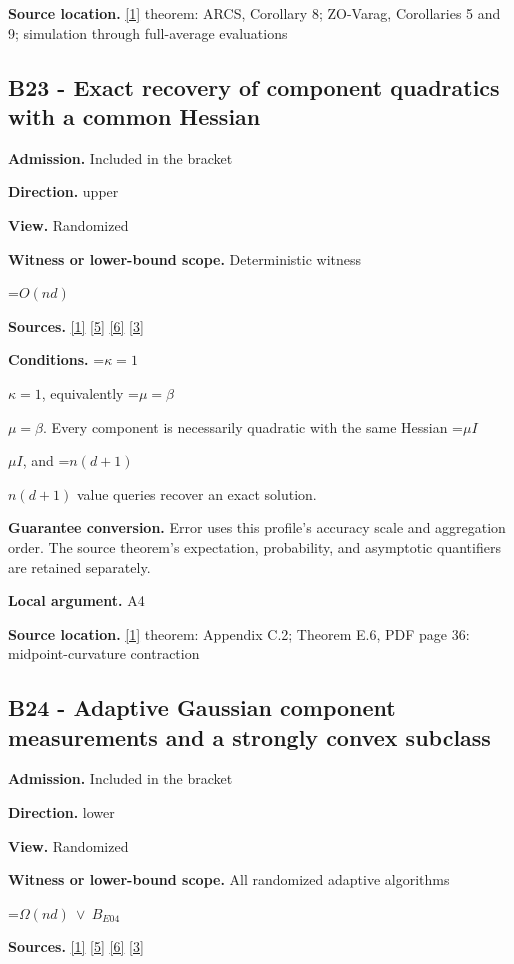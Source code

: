 \documentclass[10pt,a4paper]{article}
\newcommand{\AtlasMath}[1]{\par\begingroup\centering\setbox0=\hbox{$\displaystyle #1$}\ifdim\wd0>1.4\linewidth\typeout{ATLAS WIDE FORMULA: \the\wd0}\fi\ifdim\wd0>\linewidth\resizebox{\linewidth}{!}{\box0}\else\box0\fi\par\endgroup}
\newcommand{\AtlasInlineMath}[1]{\begingroup\setbox0=\hbox{$#1$}\ifdim\wd0>.4\linewidth\endgroup\AtlasMath{#1}\else\endgroup$#1$\fi}
\begin{document}
\textbf{Source location.} \href{https://arxiv.org/html/2610.00345v1}{[1]} theorem: ARCS, Corollary 8; ZO-Varag, Corollaries 5 and 9; simulation through full-average evaluations

\subsection{B23 - Exact recovery of component quadratics with a common Hessian}
\textbf{Admission.} Included in the bracket

\textbf{Direction.} upper

\textbf{View.} Randomized

\textbf{Witness or lower-bound scope.} Deterministic witness

\AtlasMath{O(nd)}
\textbf{Sources.} \href{https://arxiv.org/html/2610.00345v1}{[1]} \href{https://arxiv.org/html/2607.16558v2}{[5]} \href{https://www.mathnet.ru/php/archive.phtml?jrnid=mzm&option_lang=eng&paperid=1697&wshow=paper}{[6]} \href{https://arxiv.org/abs/2109.08858}{[3]}

\textbf{Conditions.} \AtlasInlineMath{\kappa=1}, equivalently \AtlasInlineMath{\mu=\beta}. Every component is necessarily quadratic with the same Hessian \AtlasInlineMath{\mu I}, and \AtlasInlineMath{n(d+1)} value queries recover an exact solution.

\textbf{Guarantee conversion.} Error uses this profile's accuracy scale and aggregation order. The source theorem's expectation, probability, and asymptotic quantifiers are retained separately.

\textbf{Local argument.} A4

\textbf{Source location.} \href{https://arxiv.org/html/2610.00345v1}{[1]} theorem: Appendix C.2; Theorem E.6, PDF page 36: midpoint-curvature contraction

\subsection{B24 - Adaptive Gaussian component measurements and a strongly convex subclass}
\textbf{Admission.} Included in the bracket

\textbf{Direction.} lower

\textbf{View.} Randomized

\textbf{Witness or lower-bound scope.} All randomized adaptive algorithms

\AtlasMath{\Omega(nd)\ \vee\ B_{E04}}
\textbf{Sources.} \href{https://arxiv.org/html/2610.00345v1}{[1]} \href{https://arxiv.org/html/2607.16558v2}{[5]} \href{https://www.mathnet.ru/php/archive.phtml?jrnid=mzm&option_lang=eng&paperid=1697&wshow=paper}{[6]} \href{https://arxiv.org/abs/2109.08858}{[3]}
\end{document}
